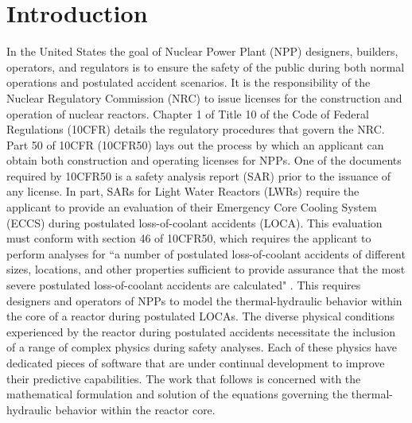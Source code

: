 \chapter{Introduction}
\label{chap:intro}
In the United States the goal of Nuclear Power Plant (NPP) designers, builders, operators, and regulators is to ensure the safety of the public during both normal operations and postulated accident scenarios.
It is the responsibility of the Nuclear Regulatory Commission (NRC) to issue licenses for the construction and operation of nuclear reactors.
Chapter 1 of Title 10 of the Code of Federal Regulations (10CFR) details the regulatory procedures that govern the NRC.
Part 50 of 10CFR (10CFR50) lays out the process by which an applicant can obtain both construction and operating licenses for NPPs.
One of the documents required by 10CFR50 is a safety analysis report (SAR) prior to the issuance of any license.
In part, SARs for Light Water Reactors (LWRs) require the applicant to provide an evaluation of their Emergency Core Cooling System (ECCS) during postulated loss-of-coolant accidents (LOCA).
This evaluation must conform with section 46 of 10CFR50, which requires the applicant to perform analyses for ``a number of postulated loss-of-coolant accidents of different sizes, locations, and other properties sufficient to provide assurance that the most severe postulated loss-of-coolant accidents are calculated" \cite{CFR10}.
This requires designers and operators of NPPs to model the thermal-hydraulic behavior within the core of a reactor during postulated LOCAs.  
The diverse physical conditions experienced by the reactor during postulated accidents necessitate the inclusion of a range of complex physics during safety analyses.
Each of these physics have dedicated pieces of software that are under continual development to improve their predictive capabilities.
The work that follows is concerned with the mathematical formulation and solution of the equations governing the thermal-hydraulic behavior within the reactor core.

